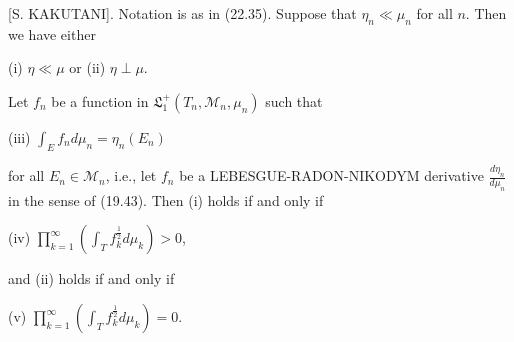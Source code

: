 [S. KAKUTANI]. Notation is as in (22.35). Suppose that $\eta_n \ll \mu_n$ for all $n$. Then we have either

(i) $\eta \ll \mu$
or
(ii) $\eta \perp \mu$.

Let $f_n$ be a function in $\mathfrak{L}_1^+ (T_n, \mathcal{M}_n, \mu_n)$ such that

(iii) $\int_E f_n d\mu_n = \eta_n(E_n)$

for all $E_n \in \mathcal{M}_n$, i.e., let $f_n$ be a LEBESGUE-RADON-NIKODYM derivative $\frac{d\eta_n}{d\mu_n}$ in the sense of (19.43). Then (i) holds if and only if

(iv) $\prod_{k=1}^{\infty} \left( \int_T f_k^{\frac{1}{2}} d\mu_k \right) > 0$,

and (ii) holds if and only if

(v) $\prod_{k=1}^{\infty} \left( \int_T f_k^{\frac{1}{2}} d\mu_k \right) = 0$.